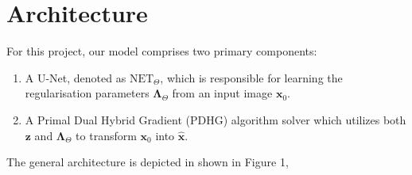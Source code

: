 \documentclass[12pt]{article}
\begin{document}




\section{Architecture}




For this project, our model comprises two primary components:
\begin{enumerate}
    \item A U-Net, denoted as $\text{NET}_{\Theta}$, which is responsible for learning the regularisation parameters $\mathbf{\Lambda}_{\Theta}$ from an input image $\mathbf{x}_0$.
    \item A Primal Dual Hybrid Gradient (PDHG) algorithm solver 
    which utilizes both $\mathbf{z}$ and $\mathbf{\Lambda}_{\Theta}$ to transform $\mathbf{x}_0$ into $\hat{\mathbf{x}}$. 
\end{enumerate}

The general architecture is depicted in shown in Figure 1,
\end{document}
